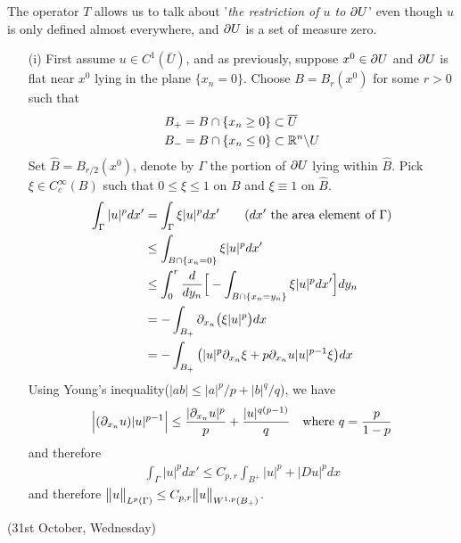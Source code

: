 \documentclass[10pt,a4paper]{report}
\newenvironment{proof}
{\begin{changemargin}{1cm}{0.5cm} 
	}%
	{\end{changemargin}
}
\begin{document}
The operator $T$ allows us to talk about '\emph{the restriction of $u$ to $\partial U$}' even though $u$ is only defined almost everywhere, and $\partial U$ is a set of measure zero.
\begin{proof}
\pf \begin{itemize}
\item[(i)] First assume $u\in C^1(\bar{U})$, and as previously, suppose $x^0 \in \partial U$ and $\partial U$ is flat near $x^0$ lying in the plane $\{x_n =0\}$. Choose $B = B_r(x^0)$ for some $r>0$ such that
\begin{align*}
& B_+ = B \cap \{x_n \geq 0 \} \subset \overline{U} \\
& B_- = B \cap \{x_n \leq 0 \} \subset \mathbb{R}^n \backslash U
\end{align*}
Set $\hat{B} = B_{r/2}(x^0)$, denote by $\Gamma$ the portion of $\partial U$ lying within $\hat{B}$. Pick $\xi \in C_c^{\infty}(B)$ such that $0\leq \xi \leq 1$ on $B$ and $\xi \equiv 1$ on $\hat{B}$. 
\begin{align*}
\int_{\Gamma} |u|^p dx'  &= \int_{\Gamma} \xi |u|^p dx' \quad \quad (dx' \text{ the area element of } \Gamma) \\
&\leq \int_{B\cap \{x_n =0\}} \xi |u|^p dx' \\
&\leq \int_{0}^r \frac{d}{dy_n} \Big[ - \int_{B\cap \{x_n = y_n \}} \xi |u|^p dx' \Big] dy_n \\
&= - \int_{B_+}  \partial_{x_n} \big(\xi |u|^p \big) dx \\
&= - \int_{B_+} \big( |u|^p \partial_{x_n}\xi  + p \partial_{x_n} u |u|^{p-1} \xi \big) dx
\end{align*}
Using Young's inequality($|ab| \leq |a|^p/p + |b|^q/q$), we have
\begin{align*}
\Big| (\partial_{x_n} u) |u|^{p-1} \Big| \leq \frac{|\partial_{x_n} u|^p}{p} + \frac{|u|^{q(p-1)}}{q} \quad \text{where } q = \frac{p}{1-p}
\end{align*}
and therefore
\begin{align*}
\int_{\Gamma} |u|^p dx' \leq C_{p,r} \int_{B^+} |u|^p + |Du|^p dx
\end{align*}
and therefore $\bigl\lVert u\bigr\rVert_{L^p(\Gamma)} \leq C_{p,r} \bigl\lVert u\bigr\rVert_{W^{1,p}(B_+)}$.
\end{itemize}
\end{proof}
\s

\newday

(31st October, Wednesday)
\s
\end{document}
